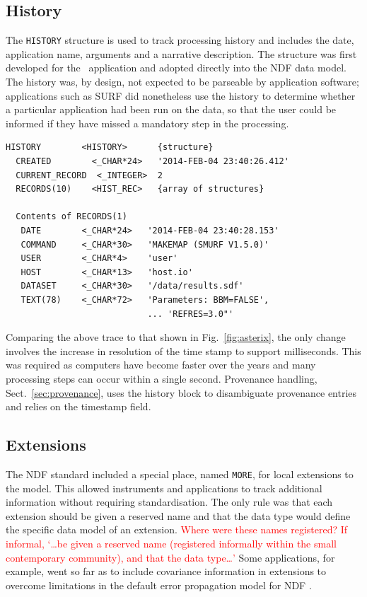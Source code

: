 \documentclass[final,authoryear,5p,times,twocolumn]{elsarticle}
\newcommand*\secref[1]{Sect.~\ref{#1}}
\begin{document}
\subsection{History}

The \texttt{HISTORY} structure is used to track processing history and
includes the date, application name, arguments and a narrative
description. The structure was first developed for the
\asterix\ application and adopted directly into the NDF data
model. The history was, by design, not expected to be parseable by
application software; applications such as SURF
\citep{1998ASPC..145..216J} did nonetheless use the history to determine whether a
particular application had been run on the data, so that the user could be
informed if they have missed a mandatory step in the processing.

{\small
\begin{verbatim}
HISTORY        <HISTORY>      {structure}
  CREATED        <_CHAR*24>   '2014-FEB-04 23:40:26.412'
  CURRENT_RECORD  <_INTEGER>  2
  RECORDS(10)    <HIST_REC>   {array of structures}

  Contents of RECORDS(1)
   DATE        <_CHAR*24>   '2014-FEB-04 23:40:28.153'
   COMMAND     <_CHAR*30>   'MAKEMAP (SMURF V1.5.0)'
   USER        <_CHAR*4>    'user'
   HOST        <_CHAR*13>   'host.io'
   DATASET     <_CHAR*30>   '/data/results.sdf'
   TEXT(78)    <_CHAR*72>   'Parameters: BBM=FALSE',
                            ... 'REFRES=3.0"'
\end{verbatim}
}

Comparing the above trace to that shown in Fig.~\ref{fig:asterix},
the only change involves the increase in resolution of the time
stamp to support milliseconds. This was required as computers have
become faster over the years and many processing steps can occur
within a single second. Provenance handling, \secref{sec:provenance},
uses the history block to disambiguate provenance entries and relies
on the timestamp field.

\subsection{Extensions}
\label{sec:more}

The NDF standard included a special place, named \texttt{MORE}, for local extensions to the
model. This allowed instruments and applications to track additional
information without requiring standardisation. The only rule was that
each extension should be given a reserved name and that the data type
would define the specific data model of an extension.
\textcolor{red}{Where were these names registered?  If informal,
  `\dots be given a reserved name (registered informally within the
  small contemporary community), and that the data type\dots'}
Some
applications, for example, went so far as to include covariance
information in extensions to overcome limitations in the default error
propagation model for NDF \citep[for example \specdre;][]{SUN140}.
\end{document}

